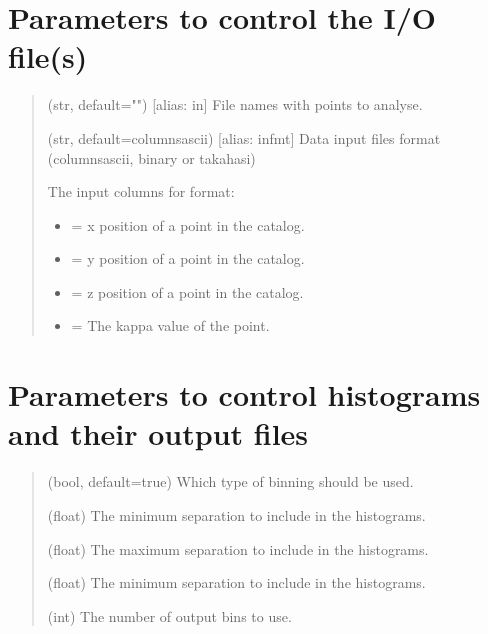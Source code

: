 \documentclass[letterpaper,10pt,english]{sphinxmanual}
\begin{document}
\section{Parameters to control the I/O file(s)}
\label{\detokenize{params:parameters-to-control-the-i-o-file-s}}\begin{quote}\begin{description}
\sphinxAtStartPar
(str, default="") {[}alias: in{]} File names with points to analyse.

\sphinxAtStartPar
(str, default=columns\sphinxhyphen{}ascii) {[}alias: infmt{]} Data input files format (columns\sphinxhyphen{}ascii, binary or takahasi)

\sphinxAtStartPar
The input columns for  format:
\begin{itemize}
\item {} 
\sphinxAtStartPar
{} = x position of a point in the catalog.

\item {} 
\sphinxAtStartPar
{} = y position of a point in the catalog.

\item {} 
\sphinxAtStartPar
{} = z position of a point in the catalog.

\item {} 
\sphinxAtStartPar
{} = The kappa value of the point.

\end{itemize}

\end{description}\end{quote}


\section{Parameters to control histograms and their output files}
\label{\detokenize{params:parameters-to-control-histograms-and-their-output-files}}\begin{quote}\begin{description}
\sphinxAtStartPar
(bool, default=true) Which type of binning should be used.

\sphinxAtStartPar
(float) The minimum separation to include in the histograms.

\sphinxAtStartPar
(float) The maximum separation to include in the histograms.

\sphinxAtStartPar
(float) The minimum separation to include in the histograms.

\sphinxAtStartPar
(int) The number of output bins to use.

\end{description}\end{quote}
\end{document}
